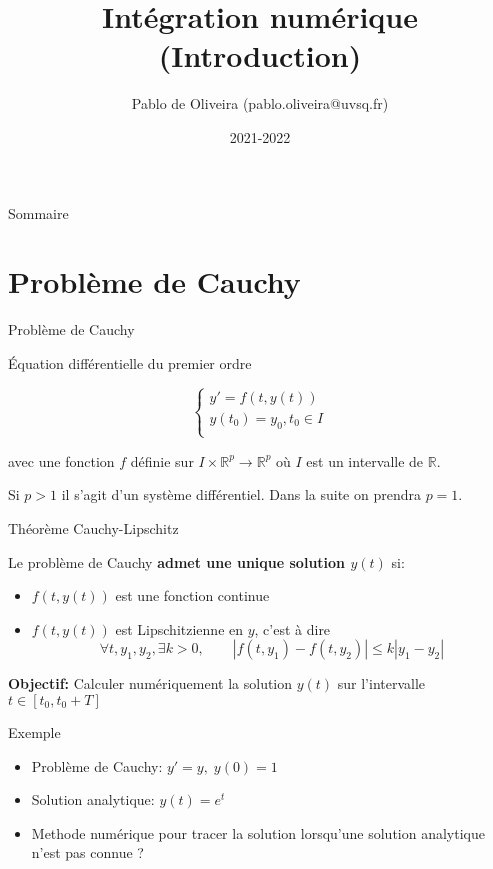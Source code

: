 \documentclass{beamer}
\title{Intégration numérique (Introduction)}
\author{Pablo de Oliveira (pablo.oliveira@uvsq.fr)}
\institute{M1 Calcul Haute Performance Simulation, Calcul Numérique}
\date{2021-2022}
\begin{document}
\maketitle

\begin{frame}{Sommaire}
    \tableofcontents
\end{frame}

\section{Problème de Cauchy}
\begin{frame}{Problème de Cauchy}

    Équation différentielle du premier ordre

    \begin{equation*}
        \left\{
        \begin{array}{l}
            y' = f(t,y(t))          \\
            y(t_0) = y_0, t_0 \in I \\
        \end{array}
        \right.
    \end{equation*}

    avec une fonction $f$ définie sur $I \times \mathbb{R}^p \rightarrow \mathbb{R}^p$ où $I$ est un intervalle de $\mathbb{R}$.

    Si $p > 1$ il s'agit d'un système différentiel. Dans la suite on prendra $p = 1$.
\end{frame}

\begin{frame}{Théorème Cauchy-Lipschitz}

    Le problème de Cauchy \textbf{admet une unique solution $y(t)$} si:
    \begin{itemize}
        \item $f(t, y(t))$ est une fonction continue
        \item $f(t, y(t))$ est Lipschitzienne en $y$, c'est à dire
              \[ \forall t,y_1,y_2, \exists k > 0, \qquad |f(t,y_1) - f(t,y_2)| \leq k|y_1-y_2| \]
    \end{itemize}
    \vfill

    \textbf{Objectif:} Calculer numériquement la solution $y(t)$ sur l'intervalle $t \in [t_0,t_0+T]$

\end{frame}

\begin{frame}{Exemple}
    \begin{itemize}
        \item Problème de Cauchy: $ y'=y,\; y(0) = 1$

        \item Solution analytique: $y(t)=e^t$

        \item Methode numérique pour tracer la solution lorsqu'une solution analytique n'est pas connue ?
    \end{itemize}

\end{frame}
\end{document}
